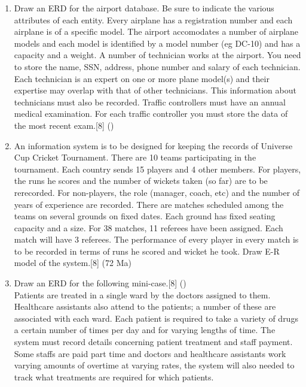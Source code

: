 \documentclass[12pt]{article}
\begin{document}
\begin{enumerate}
    \item Draw an ERD for the airport database. Be sure to indicate the various attributes of each entity. Every airplane has a registration number and each airplane is of a specific model. The airport accomodates a number of airplane models and each model is identified by a model number (eg DC-10) and has a capacity and a weight. A number of technician works at the airport. You need to store the name, SSN, address, phone number and salary of each technician. Each technician is an expert on one or more plane model(s) and their expertise may overlap with that of other technicians. This information about technicians must also be recorded. Traffic controllers must have an annual medical examination. For each traffic controller you must store the data of the most recent exam.\hfill[8] ()

    \item An information system is to be designed for keeping the records of Universe Cup Cricket Tournament. There are 10 teams participating in the tournament. Each country sends 15 players and 4 other members. For players, the runs he scores and the number of wickets taken (so far) are to be rerecorded. For non-players, the role (manager, coach, etc) and the number of years of experience are recorded. There are matches scheduled among the teams on several grounds on fixed dates. Each ground has fixed seating capacity and a size. For 38 matches, 11 referees have been assigned. Each match will have 3 referees. The performance of every player in every match is to be recorded in terms of runs he scored and wicket he took. Draw E-R model of the system.\hfill[8] (72 Ma)

    \item Draw an ERD for the following mini-case.\hfill[8] ()\\
    Patients are treated in a single ward by the doctors assigned to them. Healthcare assistants also attend to the patients; a number of these are associated with each ward. Each patient is required to take a variety of drugs a certain number of times per day and for varying lengths of time. The system must record details concerning patient treatment and staff payment. Some staffs are paid part time and doctors and healthcare assistants work varying amounts of overtime at varying rates, the system will also needed to track what treatments are required for which patients.


\end{enumerate}
\end{document}

